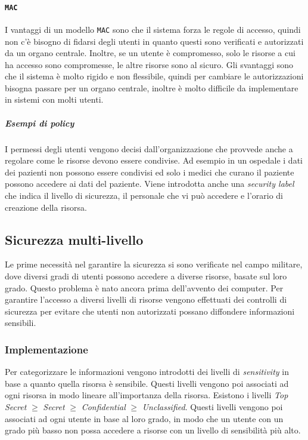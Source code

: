         \paragraph{\texttt{MAC}} I vantaggi di un modello \texttt{MAC} sono che il sistema forza le regole di accesso, quindi non c'è bisogno di fidarsi degli utenti in quanto questi sono verificati e autorizzati da un organo centrale. Inoltre, se un utente è compromesso, solo le risorse a cui ha accesso sono compromesse, le altre risorse sono al sicuro. Gli svantaggi sono che il sistema è molto rigido e non flessibile, quindi per cambiare le autorizzazioni bisogna passare per un organo centrale, inoltre è molto difficile da implementare in sistemi con molti utenti.
            \subparagraph{Esempi di \textit{policy}} I permessi degli utenti vengono decisi dall'organizzazione che provvede anche a regolare come le risorse devono essere condivise. Ad esempio in un ospedale i dati dei pazienti non possono essere condivisi ed solo i medici che curano il paziente possono accedere ai dati del paziente. Viene introdotta anche una \textit{security label} che indica il livello di sicurezza, il personale che vi può accedere e l'orario di creazione della risorsa.
    \subsection{Sicurezza multi-livello}
        Le prime necessità nel garantire la sicurezza si sono verificate nel campo militare, dove diversi gradi di utenti possono accedere a diverse risorse, basate sul loro grado. Questo problema è nato ancora prima dell'avvento dei computer. Per garantire l'accesso a diversi livelli di risorse vengono effettuati dei controlli di sicurezza per evitare che utenti non autorizzati possano diffondere informazioni sensibili.
        \subsubsection{Implementazione}
            Per categorizzare le informazioni vengono introdotti dei livelli di \textit{sensitivity} in base a quanto quella risorsa è sensibile. Questi livelli vengono poi associati ad ogni risorsa in modo lineare all'importanza della risorsa. Esistono i livelli \textit{Top Secret} $\geq$ \textit{Secret} $\geq$ \textit{Confidential} $\geq$ \textit{Unclassified}. Questi livelli vengono poi associati ad ogni utente in base al loro grado, in modo che un utente con un grado più basso non possa accedere a risorse con un livello di sensibilità più alto.

